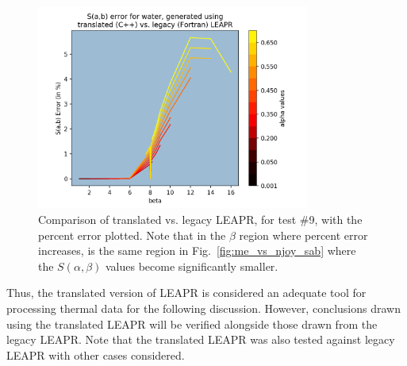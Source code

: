 \documentclass[Master.tex]{subfiles}
\begin{document}
                      \begin{figure}[h]
                          \begin{center}
                             \includegraphics[width=0.8\textwidth]{images/me-vs-njoy-3}
                             \caption[Comparison of Translated vs. Legacy LEAPR, for Test \#9 (\% Error) ]{Comparison of translated vs. legacy LEAPR, for test \#9, with the percent error plotted. Note that in the $\beta$ region where percent error increases, is the same region in Fig.~\ref{fig:me_vs_njoy_sab} where the $S(\alpha,\beta)$ values become significantly smaller.}
                             \label{fig:me_vs_njoy_error}
                          \end{center}
                      \end{figure}
                      Thus, the translated version of LEAPR is considered an adequate tool for processing thermal data for the following discussion. However, conclusions drawn using the translated LEAPR will be verified alongside those drawn from the legacy LEAPR. Note that the translated LEAPR was also tested against legacy LEAPR with other cases considered.
                      
\end{document}
